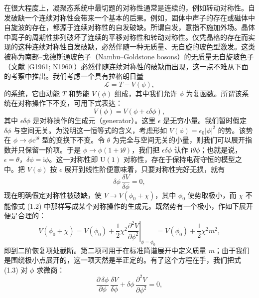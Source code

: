在很大程度上，凝聚态系统中最切题的对称性通常是连续的，例如转动对称性。自发破缺一个连续对称性会带来一个基本的后果。例如，固体中声子的存在或磁体中自旋波的存在，都源于连续对称性的自发破缺。所谓自发，意指不施加外场。晶体中离子的周期性排列破坏了连续的平移对称性和转动对称性。仅凭晶格的存在而实现的这种连续对称性自发破缺，必然伴随一种无质量、无自旋的玻色型激发。这类被称为南部–戈德斯通玻色子（Nambu–Goldstone bosons）的无质量无自旋玻色子（文献 [G1961; N1960]）必然伴随连续对称性的破缺而出现，这一点不难从下面的考察中推出。我们考虑一个具有拉格朗日量
\begin{equation*}
\mathcal{L}=T-V(\phi),
\tag{1.1}
\end{equation*}
的系统，它由动能 $T$ 和势能 $V(\phi)$ 组成，其中我们允许 $\phi$ 为复函数。所谓该系统在对称操作下不变，可用下式表达：
\begin{equation*}
V(\phi)=V(\phi+\epsilon\delta\phi),
\tag{1.2}
\end{equation*}
其中 $\epsilon\delta\phi$ 是对称操作的生成元（generator）。这里 $\epsilon$ 是无穷小量。我们暂时假定 $\delta\phi$ 与空间无关。为说明这一恒等式的含义，考虑形如 $V(\phi)=\epsilon_0|\phi|^2$ 的势。该势在 $\phi\to\phi\mathrm{e}^{\mathrm{i}\theta}$ 型的变换下不变。令 $\theta$ 为完全与空间无关的小量，则我们可以展开指数并只保留一阶项。于是 $\phi\to\phi(1+\mathrm{i}\theta)$，我们把 $\epsilon\delta\phi$ 认作 $\mathrm{i}\theta\phi$；也就是说，$\epsilon=\theta$，$\delta\phi=\mathrm{i}\phi$。这一对称性即 $\mathrm{U}(1)$ 对称性，存在于保持电荷守恒的模型之中。把 $V(\phi)$ 按 $\epsilon$ 展开到线性阶便意味着，只要对称性完好无损，就有
\begin{equation*}
\delta\phi\,\frac{\delta V}{\delta\phi}=0,
\tag{1.3}
\end{equation*}
现在明确假定对称性被破缺，使 $V\to V(\phi_0+\chi)$，其中 $\phi_0$ 使势取极小，而 $\chi$ 不能像式 (1.2) 中那样写成某个对称操作的生成元。既然势有一个极小，作如下展开便是合理的：
\begin{equation*}
V(\phi_0+\chi)=V(\phi_0)+\frac{1}{2}\chi^2\left.\frac{\partial^2 V}{\partial\phi^2}\right|_{\phi=\phi_0}=V(\phi_0)+\frac{1}{2}\chi^2 m^2,
\tag{1.4}
\end{equation*}
即到二阶恢复项处截断。第二项可用于在标准简谐展开中定义质量 $m$；由于我们是围绕极小点展开的，这一项天然是半正定的。有了这个方程在手，我们把式 (1.3) 对 $\phi$ 求微商：
\begin{equation*}
\frac{\partial\,\delta\phi}{\partial\phi}\,\frac{\delta V}{\delta\phi}+\delta\phi\,\frac{\partial^2 V}{\partial\phi^2}=0,
\tag{1.5}
\end{equation*}
